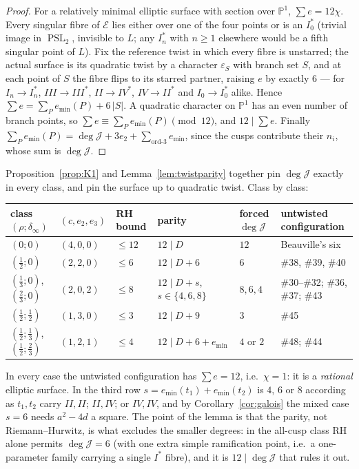 \documentclass[11pt,reqno]{amsart}
\theoremstyle{plain}
\theoremstyle{definition}
\theoremstyle{remark}
\theoremstyle{plain}
\newcommand{\PP}{\mathbb{P}}
\DeclareMathOperator{\PSL}{PSL}
\begin{document}
\begin{proof}
For a relatively minimal elliptic surface with section over $\PP^1$,
$\sum e=12\chi$. Every singular fibre of $\mathcal E$ lies either over one of the
four points or is an $I_0^*$ (trivial image in $\PSL_2$, invisible to $L$; any
$I_n^*$ with $n\ge1$ elsewhere would be a fifth singular point of $L$). Fix the
reference twist in which every fibre is unstarred; the actual surface is its
quadratic twist by a character $\varepsilon_S$ with branch set $S$, and at each point of
$S$ the fibre flips to its starred partner, raising $e$ by exactly $6$ --- for
$I_n\!\to\!I_n^*$, $III\!\to\!III^*$, $II\!\to\!IV^*$, $IV\!\to\!II^*$ and
$I_0\!\to\!I_0^*$ alike. Hence $\sum e=\sum_Pe_{\min}(P)+6\,|S|$. A quadratic
character on $\PP^1$ has an even number of branch points, so
$\sum e\equiv\sum_Pe_{\min}(P)\pmod{12}$, and $12\mid\sum e$. Finally
$\sum_Pe_{\min}(P)=\deg\mathcal J+3e_2+\sum_{\text{ord-}3}e_{\min}$, since the
cusps contribute their $n_i$, whose sum is $\deg\mathcal J$.
\end{proof}

Proposition~\ref{prop:K1} and Lemma~\ref{lem:twistparity} together pin
$\deg\mathcal J$ exactly in every class, and pin the surface up to quadratic
twist. Class by class:

\smallskip
{\small
\begin{tabular}{@{}llllll@{}}
\hline
class $(\rho;\delta_\infty)$ & $(c,e_2,e_3)$ & RH bound & parity & forced $\deg\mathcal J$ & untwisted configuration\\
\hline
$(0;0)$ & $(4,0,0)$ & $\le12$ & $12\mid D$ & $12$ & Beauville's six\\
$(\tfrac12;0)$ & $(2,2,0)$ & $\le6$ & $12\mid D{+}6$ & $6$ & \#38, \#39, \#40\\
$(\tfrac13;0)$, $(\tfrac23;0)$ & $(2,0,2)$ & $\le8$ & $12\mid D{+}s$, $s\in\{4,6,8\}$ & $8,6,4$ & \#30--\#32; \#36, \#37; \#43\\
$(\tfrac12;\tfrac12)$ & $(1,3,0)$ & $\le3$ & $12\mid D{+}9$ & $3$ & \#45\\
$(\tfrac12;\tfrac13)$, $(\tfrac12;\tfrac23)$ & $(1,2,1)$ & $\le4$ & $12\mid D{+}6{+}e_{\min}$ & $4$ or $2$ & \#48; \#44\\
\hline
\end{tabular}
}
\smallskip

\noindent
In every case the untwisted configuration has $\sum e=12$, i.e.\ $\chi=1$: it is
a \emph{rational} elliptic surface. In the third row $s=e_{\min}(t_1)+e_{\min}(t_2)$
is $4$, $6$ or $8$ according as $t_1,t_2$ carry $II,II$; $II,IV$; or $IV,IV$, and
by Corollary~\ref{cor:galois} the mixed case $s=6$ needs $a^2-4d$ a square. The
point of the lemma is that the parity, not Riemann--Hurwitz, is what excludes the
smaller degrees: in the all-cusp class RH alone permits $\deg\mathcal J=6$ (with
one extra simple ramification point, i.e.\ a one-parameter family carrying a
single $I^*$ fibre), and it is $12\mid\deg\mathcal J$ that rules it out.
\end{document}
